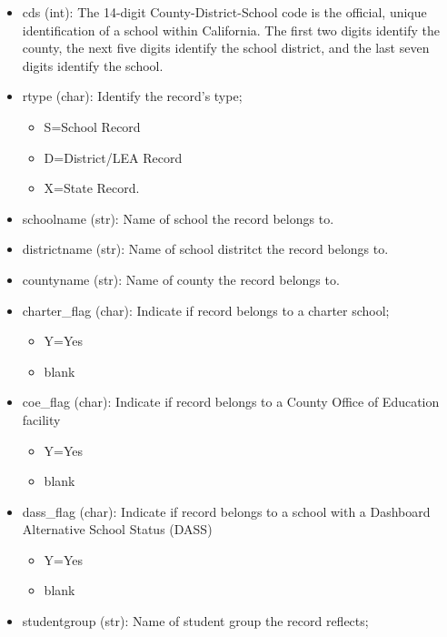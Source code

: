 \documentclass[11pt]{article}
\providecommand{\tightlist}{%
      \setlength{\itemsep}{0pt}\setlength{\parskip}{0pt}}
\begin{document}
\begin{itemize}
\tightlist
\item
  cds (int): The 14-digit County-District-School code is the official,
  unique identification of a school within California. The first two
  digits identify the county, the next five digits identify the school
  district, and the last seven digits identify the school.
\item
  rtype (char): Identify the record's type;

  \begin{itemize}
  \tightlist
  \item
    S=School Record
  \item
    D=District/LEA Record
  \item
    X=State Record.
  \end{itemize}
\item
  schoolname (str): Name of school the record belongs to.
\item
  districtname (str): Name of school distritct the record belongs to.
\item
  countyname (str): Name of county the record belongs to.
\item
  charter\_flag (char): Indicate if record belongs to a charter school;

  \begin{itemize}
  \tightlist
  \item
    Y=Yes
  \item
    blank
  \end{itemize}
\item
  coe\_flag (char): Indicate if record belongs to a County Office of
  Education facility

  \begin{itemize}
  \tightlist
  \item
    Y=Yes
  \item
    blank
  \end{itemize}
\item
  dass\_flag (char): Indicate if record belongs to a school with a
  Dashboard Alternative School Status (DASS)

  \begin{itemize}
  \tightlist
  \item
    Y=Yes
  \item
    blank
  \end{itemize}
\item
  studentgroup (str): Name of student group the record reflects;


\end{itemize}
\end{document}
